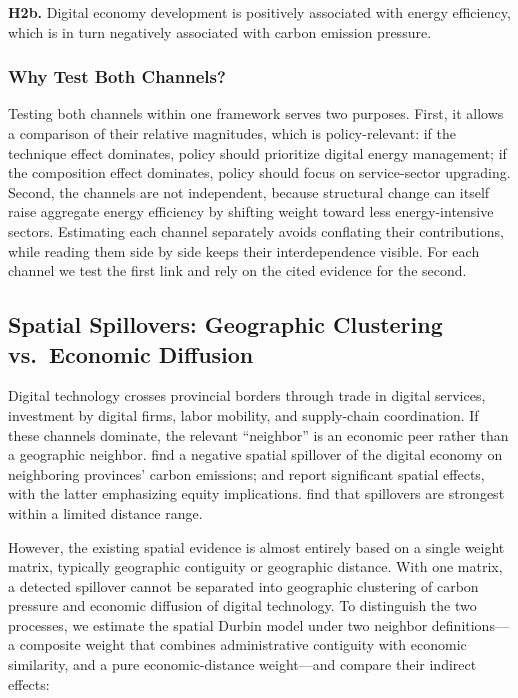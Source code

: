\documentclass[economies,article,submit,moreauthors]{Definitions/mdpi}
\begin{document}
\textbf{H2b.} Digital economy development is positively associated with energy efficiency, which is in turn negatively associated with carbon emission pressure.

\subsubsection{Why Test Both Channels?}

Testing both channels within one framework serves two purposes. First, it allows a comparison of their relative magnitudes, which is policy-relevant: if the technique effect dominates, policy should prioritize digital energy management; if the composition effect dominates, policy should focus on service-sector upgrading. Second, the channels are not independent, because structural change can itself raise aggregate energy efficiency by shifting weight toward less energy-intensive sectors. Estimating each channel separately avoids conflating their contributions, while reading them side by side keeps their interdependence visible. For each channel we test the first link and rely on the cited evidence for the second.

\subsection{Spatial Spillovers: Geographic Clustering vs.\ Economic Diffusion}

Digital technology crosses provincial borders through trade in digital services, investment by digital firms, labor mobility, and supply-chain coordination. If these channels dominate, the relevant ``neighbor'' is an economic peer rather than a geographic neighbor. \citet{yuan2024} find a negative spatial spillover of the digital economy on neighboring provinces' carbon emissions; \citet{wang2025} and \citet{niu2024} report significant spatial effects, with the latter emphasizing equity implications. \citet{zhang2025} find that spillovers are strongest within a limited distance range.

However, the existing spatial evidence is almost entirely based on a single weight matrix, typically geographic contiguity or geographic distance. With one matrix, a detected spillover cannot be separated into geographic clustering of carbon pressure and economic diffusion of digital technology. To distinguish the two processes, we estimate the spatial Durbin model under two neighbor definitions---a composite weight that combines administrative contiguity with economic similarity, and a pure economic-distance weight---and compare their indirect effects:
\end{document}
